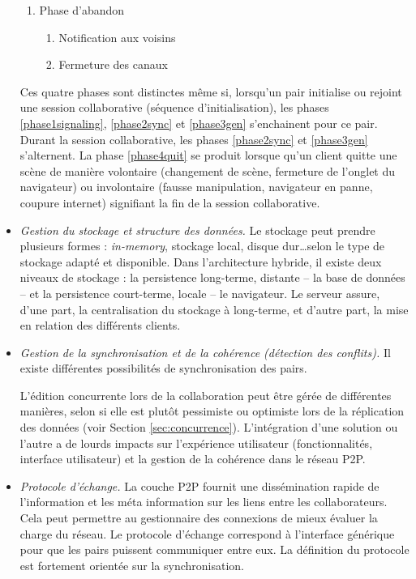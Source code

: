\begin{itemize}
\begin{enumerate}
		\item Phase d'abandon
		\label{phase4quit}
		\begin{enumerate}
			\item Notification aux voisins 
			\item Fermeture des canaux
		\end{enumerate}
	\end{enumerate}
	
	Ces quatre phases sont distinctes même si, lorsqu'un pair initialise ou rejoint 
	une 
	session collaborative (séquence d'initialisation), les phases 
	\ref{phase1signaling}, \ref{phase2sync} et \ref{phase3gen} s'enchainent pour 
	ce pair. Durant la session collaborative, les phases \ref{phase2sync} et 
	\ref{phase3gen} s'alternent. La phase \ref{phase4quit} se produit lorsque qu'un 
	client quitte une scène de manière volontaire (changement de scène, fermeture 
	de l'onglet du navigateur) ou involontaire (fausse manipulation, navigateur en 
	panne, coupure internet) signifiant la fin de la session collaborative.
	
	\item \textit{Gestion du stockage et structure des données.}
	Le stockage peut prendre plusieurs formes : \textit{in-memory}, stockage local, 
	disque dur\dots selon le type de stockage adapté et disponible. 
	Dans l'architecture hybride, il existe deux niveaux de stockage : la persistence 
	long-terme, distante -- la base de données -- et la persistence court-terme, 
	locale -- le navigateur.
	Le serveur assure, d'une part, la centralisation du stockage à long-terme, et 
	d'autre part, la mise en relation des différents clients.
	\item  \textit{Gestion de la synchronisation et de la cohérence (détection des 
	conflits).}
	Il existe différentes possibilités de synchronisation des pairs. 
	
	L'édition concurrente lors de la collaboration peut être gérée de différentes 
	manières, selon si elle est plutôt pessimiste ou optimiste lors de la réplication 
	des données (voir Section \ref{sec:concurrence}). L'intégration d'une solution ou 
	l'autre 
	a de lourds impacts sur l'expérience utilisateur (fonctionnalités, interface 
	utilisateur) et la gestion de la cohérence dans le réseau \gls{P2P}.  
	
	\item \textit{Protocole d'échange.}
	La couche \gls{P2P} fournit une dissémination rapide de l'information et les 
	méta information sur les liens entre les collaborateurs. Cela peut permettre au 
	gestionnaire des connexions de mieux évaluer la charge du réseau. Le 
	protocole d'échange correspond à l'interface générique pour que les pairs 
	puissent communiquer entre eux. La définition du protocole est fortement 
	orientée sur la synchronisation.
\end{itemize}


